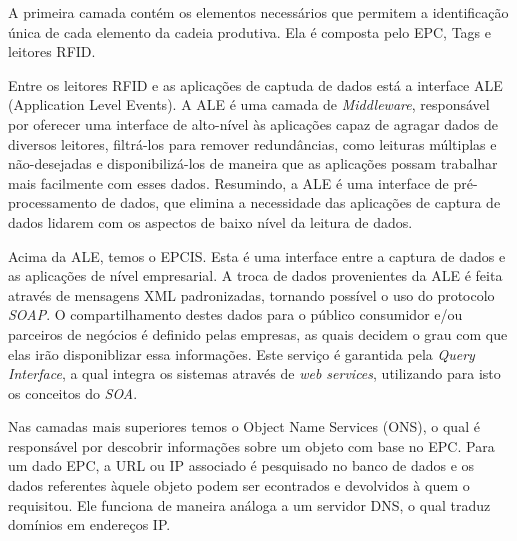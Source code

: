 \documentclass[a4paper,12pt,titlepage]{article}
\begin{document}
	A primeira camada contém os elementos necessários que permitem a identificação única de cada elemento da cadeia produtiva. Ela é composta pelo EPC, Tags e leitores RFID. 
	
	Entre os leitores RFID e as aplicações de captuda de dados está a interface ALE (Application Level Events). A ALE é uma camada de \textit{Middleware}, responsável por oferecer uma interface de alto-nível às aplicações capaz de agragar dados de diversos leitores, filtrá-los para remover redundâncias, como leituras múltiplas e não-desejadas e disponibilizá-los de maneira que as aplicações possam trabalhar mais facilmente com esses dados. Resumindo, a ALE é uma interface de pré-processamento de dados, que elimina a necessidade das aplicações de captura de dados lidarem com os aspectos de baixo nível da leitura de dados.
	
	Acima da ALE, temos o EPCIS. Esta é uma interface entre a captura de dados e as aplicações de nível empresarial. A troca de dados provenientes da ALE é feita através de mensagens XML padronizadas, tornando possível o uso do protocolo \textit{SOAP}. O compartilhamento destes dados para o público consumidor e/ou parceiros de negócios é definido pelas empresas, as quais decidem o grau com que elas irão disponiblizar essa informações. Este serviço é garantida pela \textit{Query Interface}, a qual integra os sistemas através de \textit{web services}, utilizando para isto os conceitos do \textit{SOA}. 
	
	Nas camadas mais superiores temos o Object Name Services (ONS), o qual é responsável por descobrir informações sobre um objeto com base no EPC. Para um dado EPC, a URL ou IP associado é pesquisado no banco de dados e os dados referentes àquele objeto podem ser econtrados e devolvidos à quem o requisitou. Ele funciona de maneira análoga a um servidor DNS, o qual traduz domínios em endereços IP.
	
\newpage


\nocite{*}


		
\end{document}

